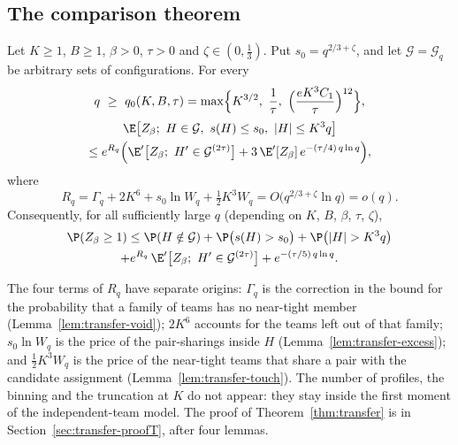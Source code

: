 \subsection{The comparison theorem}\label{sec:transfer-statement}

\begin{theorem}[Comparison]\label{thm:transfer}
Let $K\ge1$, $B\ge1$, $\beta>0$, $\tau>0$ and $\zeta\in(0,\tfrac13)$. Put
$s_0=q^{2/3+\zeta}$, and let $\mathcal G=\mathcal G_q$ be arbitrary sets of configurations.
For every
\begin{equation}\label{eq:transfer-q0}
q\ \ge\ q_0(K,B,\tau)=\max\Bigl\{K^{3/2},\ \frac1\tau,\ \Bigl(\frac{eK^3C_1}{\tau}\Bigr)^{12}\Bigr\},
\end{equation}
\begin{multline}\label{eq:transfer-comparison}
\E\bigl[Z_\beta;\ H\in\mathcal G,\ s(H)\le s_0,\ |H|\le K^3q\bigr]\\
\le e^{R_q}\Bigl(\E'\bigl[Z_\beta;\ H'\in\mathcal G^{(2\tau)}\bigr]
+3\,\E'[Z_\beta]\,e^{-(\tau/4)\,q\ln q}\Bigr),
\end{multline}
where
\begin{equation}\label{eq:transfer-Rq}
R_q=\Gamma_q+2K^6+s_0\ln W_q+\tfrac12K^3W_q=O\bigl(q^{2/3+\zeta}\ln q\bigr)=o(q).
\end{equation}
Consequently, for all sufficiently large $q$ (depending on $K$, $B$, $\beta$, $\tau$, $\zeta$),
\begin{multline}\label{eq:transfer-union}
\P(Z_\beta\ge1)\le\P(H\notin\mathcal G)+\P\bigl(s(H)>s_0\bigr)+\P\bigl(|H|>K^3q\bigr)\\
+e^{R_q}\,\E'\bigl[Z_\beta;\ H'\in\mathcal G^{(2\tau)}\bigr]+e^{-(\tau/5)\,q\ln q}.
\end{multline}
\end{theorem}

The four terms of $R_q$ have separate origins: $\Gamma_q$ is the correction in the bound for
the probability that a family of teams has no near-tight member
(Lemma~\ref{lem:transfer-void}); $2K^6$ accounts for the teams left out of that family;
$s_0\ln W_q$ is the price of the pair-sharings inside $H$ (Lemma~\ref{lem:transfer-excess});
and $\tfrac12K^3W_q$ is the price of the near-tight teams that share a pair with the candidate
assignment (Lemma~\ref{lem:transfer-touch}). The number of profiles, the binning and the
truncation at $K$ do not appear: they stay inside the first moment of the independent-team
model. The proof of Theorem~\ref{thm:transfer} is in Section~\ref{sec:transfer-proofT}, after
four lemmas.

